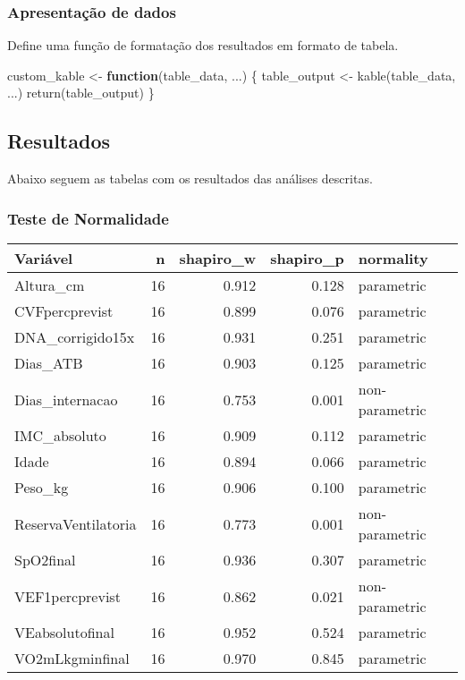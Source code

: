 \documentclass[
]{article}
\newenvironment{Shaded}{\begin{snugshade}}{\end{snugshade}}
\newcommand{\ControlFlowTok}[1]{\textcolor[rgb]{0.13,0.29,0.53}{\textbf{#1}}}
\newcommand{\FunctionTok}[1]{\textcolor[rgb]{0.00,0.00,0.00}{#1}}
\newcommand{\NormalTok}[1]{#1}
\newcommand{\OtherTok}[1]{\textcolor[rgb]{0.56,0.35,0.01}{#1}}
\begin{document}
\hypertarget{apresentauxe7uxe3o-de-dados}{%
\subsubsection{Apresentação de
dados}\label{apresentauxe7uxe3o-de-dados}}

Define uma função de formatação dos resultados em formato de tabela.

\begin{Shaded}
\begin{Highlighting}[]
\NormalTok{custom\_kable }\OtherTok{\textless{}{-}} \ControlFlowTok{function}\NormalTok{(table\_data, ...) \{}
\NormalTok{    table\_output }\OtherTok{\textless{}{-}} \FunctionTok{kable}\NormalTok{(table\_data, ...) }
    \FunctionTok{return}\NormalTok{(table\_output)}
\NormalTok{\}}
\end{Highlighting}
\end{Shaded}

\newpage

\hypertarget{resultados}{%
\subsection{Resultados}\label{resultados}}

Abaixo seguem as tabelas com os resultados das análises descritas.

\hypertarget{teste-de-normalidade-1}{%
\subsubsection{Teste de Normalidade}\label{teste-de-normalidade-1}}

\begin{tabular}{l|r|r|r|l}
\hline
Variável & n & shapiro\_w & shapiro\_p & normality\\
\hline
Altura\_cm & 16 & 0.912 & 0.128 & parametric\\
\hline
CVFpercprevist & 16 & 0.899 & 0.076 & parametric\\
\hline
DNA\_corrigido15x & 16 & 0.931 & 0.251 & parametric\\
\hline
Dias\_ATB & 16 & 0.903 & 0.125 & parametric\\
\hline
Dias\_internacao & 16 & 0.753 & 0.001 & non-parametric\\
\hline
IMC\_absoluto & 16 & 0.909 & 0.112 & parametric\\
\hline
Idade & 16 & 0.894 & 0.066 & parametric\\
\hline
Peso\_kg & 16 & 0.906 & 0.100 & parametric\\
\hline
ReservaVentilatoria & 16 & 0.773 & 0.001 & non-parametric\\
\hline
SpO2final & 16 & 0.936 & 0.307 & parametric\\
\hline
VEF1percprevist & 16 & 0.862 & 0.021 & non-parametric\\
\hline
VEabsolutofinal & 16 & 0.952 & 0.524 & parametric\\
\hline
VO2mLkgminfinal & 16 & 0.970 & 0.845 & parametric\\
\hline
\end{tabular}
\end{document}
